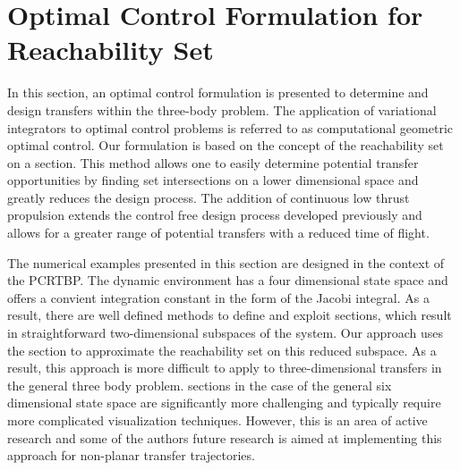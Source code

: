 \documentclass[smallcondensed]{svjour3}
\begin{document}
\section{Optimal Control Formulation for Reachability Set}\label{sec:optimal_control}
In this section, an optimal control formulation is presented to determine and design transfers within the three-body problem.
The application of variational integrators to optimal control problems is referred to as computational geometric optimal control.
Our formulation is based on the concept of the reachability set on a \Poincare section.
This method allows one to easily determine potential transfer opportunities by finding set intersections on a lower dimensional space and greatly reduces the design process.
The addition of continuous low thrust propulsion extends the control free design process developed previously and allows for a greater range of potential transfers with a reduced time of flight.

The numerical examples presented in this section are designed in the context of the PCRTBP.
The dynamic environment has a four dimensional state space and offers a convient integration constant in the form of the Jacobi integral.
As a result, there are well defined methods to define and exploit \Poincare sections, which result in straightforward two-dimensional subspaces of the system.
Our approach uses the \Poincare section to approximate the reachability set on this reduced subspace.
As a result, this approach is more difficult to apply to three-dimensional transfers in the general three body problem.
\Poincare sections in the case of the general six dimensional state space are significantly more challenging and typically require more complicated visualization techniques. 
However, this is an area of active research and some of the authors future research is aimed at implementing this approach for non-planar transfer trajectories.
\end{document}
